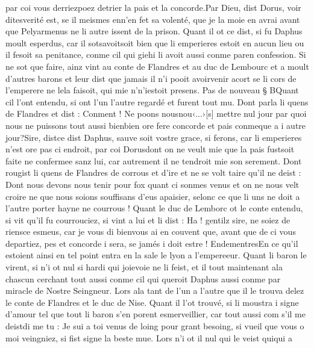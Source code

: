 \documentclass{article}
\begin{document}
\begin{pages}
      par coi vous derriezpoez detrier la pais et la concorde.Par Dieu, dist Dorus, 
      voir ditesverité est, se il meismes 
      enn'en fet sa volenté, que je la moie en avrai avant que 
      Pelyarmenus ne li autre issent de la prison.
   Quant il ot ce dist, si fu Daphus moult esperdus, 
   car il sotsavoitsoit bien que 
   li emperieres estoit en aucun lieu ou il fesoit sa penitance, 
   conme cil qui giehi li avoit aussi conme paren confession. 
   Si ne sot que faire, ainz vint au 
   conte de Flandres et au 
   duc de Lembourc et a moult d’autres barons et leur dist que 
   jamais il n’i pooit 
      avoirvenir 
      acort se li cors de l’emperere 
      ne lela faisoit, qui mie 
      n’n'iestoit presens. \pend
\pstart Pas de nouveau § BQuant cil l’ont entendu, 
   si ont l’un l’autre regardé et furent tout mu. 
   Dont parla li quens de Flandres et dist :
   Conment ! Ne poons 
      nousnou‹...›[s] mettre nul jour 
      par quoi nous ne puissons tout aussi bienbien ore fere concorde et pais 
      conmeque a i autre jour?Sire, distce dist 
      Daphus, sauve soit vostre grace, si ferons, 
   car li emperieres n’est ore pas ci endroit, 
      par coi Dorusdont on
      ne veult mie que la pais fustsoit faite ne confermee 
      sanz lui, car autrement il ne tendroit mie son serement.
   Dont rougist li quens 
      de 
      Flandres de corrous et d’ire 
   et ne se volt taire qu’il ne deist :
   Dont nous devons nous tenir pour fox quant ci sonmes venus et on ne nous velt croire ne que nous 
      soions souffisans d’eus apaisier, selonc ce que li uns ne doit a l’autre porter hayne ne courrous ! \pend
\pstart Quant le duc de Lemborc ot 
   le conte entendu, si vit qu’il fu courrouciez, si vint a lui et li dist :
   Ha ! gentilz sire, ne soiez de riensce esmeus, 
      car je vous di bienvous ai en couvent que, 
   avant que de ci vous departiez, pes et concorde i sera, se jamés i doit estre !
   EndementresEn ce qu’il estoient ainsi en tel point entra en la sale 
   le lyon a l'empereeur. Quant li baron le virent, 
   si n’i ot nul si hardi qui joievoie ne li feist, 
   et il tout maintenant ala chascun cerchant tout aussi conme cil qui queroit Daphus aussi 
   conme par miracle de Nostre Seingneur. Lors ala tant de l’un a l’autre que il le trouva delez 
   le conte de Flandres et 
   le duc de Nise. Quant il l’ot trouvé, si li moustra 
   i signe d’amour tel que tout li baron s’en porent esmerveillier, 
   car tout aussi com s’il me deistdi me tu :
   Je sui a toi venus de loing pour grant besoing, si vueil que vous o moi veingniez, 
   si fist signe la beste mue. Lors n’i ot il nul qui le veist quiqui a 

\end{pages}
\end{document}
